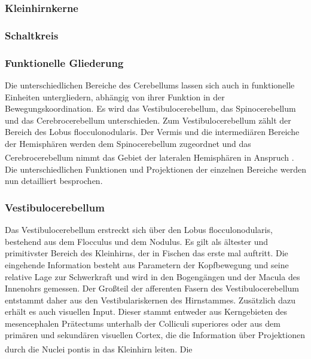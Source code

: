 \documentclass[12pt,a4paper,pdftex]{article}
\begin{document}
\subsubsection{Kleinhirnkerne}

\subsubsection{Schaltkreis}

\subsubsection{Funktionelle Gliederung}
Die unterschiedlichen Bereiche des Cerebellums lassen sich auch in funktionelle Einheiten untergliedern, abhängig von ihrer Funktion in der Bewegungskoordination. Es wird das Vestibulocerebellum, das Spinocerebellum und das Cerebrocerebellum unterschieden. Zum Vestibulocerebellum zählt der Bereich des Lobus flocculonodularis. Der Vermis und die intermediären Bereiche der Hemisphären werden dem Spinocerebellum zugeordnet und das Cerebrocerebellum nimmt das Gebiet der lateralen Hemisphären in Anspruch \textsuperscript{\cite[42]{kandel2013principles}}. Die unterschiedlichen Funktionen und Projektionen der einzelnen Bereiche werden nun detailliert besprochen. 

\subsubsection*{Vestibulocerebellum} 
Das Vestibulocerebellum erstreckt sich über den Lobus flocculonodularis, bestehend aus dem Flocculus und dem Nodulus. Es gilt als ältester und primitivster Bereich des Kleinhirns, der in Fischen das erste mal auftritt. Die eingehende Information besteht aus Parametern der Kopfbewegung und seine relative Lage zur Schwerkraft und wird in den Bogengängen und der Macula des Innenohrs gemessen. Der Großteil der afferenten Fasern des Vestibulocerebellum entstammt daher aus den Vestibulariskernen des Hirnstammes. Zusätzlich dazu erhält es auch visuellen Input. Dieser stammt entweder aus Kerngebieten des mesencephalen Prätectums unterhalb der Colliculi superiores oder aus dem primären und sekundären visuellen Cortex, die die Information über Projektionen durch die Nuclei pontis in das Kleinhirn leiten. Die    \textsuperscript{\cite[42]{kandel2013principles}}        
\end{document}
